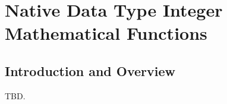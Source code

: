 \chapter{Native Data Type Integer Mathematical Functions}
\label{cbaf0}

\section{Introduction and Overview}
\label{cbaf0:siov0}

TBD.


